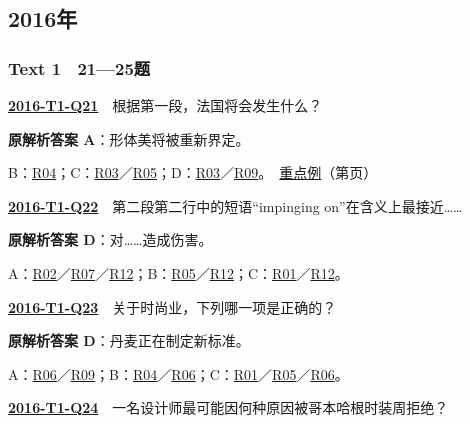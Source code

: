 \documentclass[11pt,a4paper]{article}
\begin{document}
\subsection{2016年}\label{year-2016}
\subsubsection{Text 1　21—25题}
\label{idx-2016-T1-Q21}\noindent\textbf{\href{https://zj139.github.io/math-notes/english/199237d5df9b8cc835b3f5e8/\#q21}{2016-T1-Q21}}　根据第一段，法国将会发生什么？\par\nopagebreak
\noindent\textbf{原解析答案 A}：形体美将被重新界定。\par\nopagebreak
\noindent B：\hyperref[cat-R04]{R04}；C：\hyperref[cat-R03]{R03}／\hyperref[cat-R05]{R05}；D：\hyperref[cat-R03]{R03}／\hyperref[cat-R09]{R09}。　\hyperref[case-2016-T1-Q21]{重点例}（第\pageref{case-2016-T1-Q21}页）\par\smallskip
{}\label{idx-2016-T1-Q22}\noindent\textbf{\href{https://zj139.github.io/math-notes/english/199237d5df9b8cc835b3f5e8/\#q22}{2016-T1-Q22}}　第二段第二行中的短语“impinging on”在含义上最接近……\par\nopagebreak
\noindent\textbf{原解析答案 D}：对……造成伤害。\par\nopagebreak
\noindent A：\hyperref[cat-R02]{R02}／\hyperref[cat-R07]{R07}／\hyperref[cat-R12]{R12}；B：\hyperref[cat-R05]{R05}／\hyperref[cat-R12]{R12}；C：\hyperref[cat-R01]{R01}／\hyperref[cat-R12]{R12}。\par\smallskip
{}\label{idx-2016-T1-Q23}\noindent\textbf{\href{https://zj139.github.io/math-notes/english/199237d5df9b8cc835b3f5e8/\#q23}{2016-T1-Q23}}　关于时尚业，下列哪一项是正确的？\par\nopagebreak
\noindent\textbf{原解析答案 D}：丹麦正在制定新标准。\par\nopagebreak
\noindent A：\hyperref[cat-R06]{R06}／\hyperref[cat-R09]{R09}；B：\hyperref[cat-R04]{R04}／\hyperref[cat-R06]{R06}；C：\hyperref[cat-R01]{R01}／\hyperref[cat-R05]{R05}／\hyperref[cat-R06]{R06}。\par\smallskip
{}\label{idx-2016-T1-Q24}\noindent\textbf{\href{https://zj139.github.io/math-notes/english/199237d5df9b8cc835b3f5e8/\#q24}{2016-T1-Q24}}　一名设计师最可能因何种原因被哥本哈根时装周拒绝？\par\nopagebreak
\end{document}
